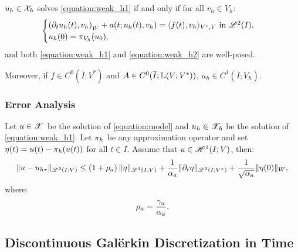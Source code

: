 \begin{proposition}[Equivalence]
    $u_h \in \mathcal{X}_h$ solves \cref{equation:weak_h1} if and only if for all $v_h \in V_h$:
    \begin{align}
        \begin{cases} \label{equation:weak_h2}
            \left( \partial_t u_h(t), v_h \right)_W + a(t; u_h(t), v_h) = \langle f(t), v_h \rangle_{V^*, V} \text{ in } \mathscr{L}^{2}(I), \\
            u_h(0) = \pi_{V_h}(u_0),
        \end{cases}
    \end{align}
    and both \cref{equation:weak_h1} and \cref{equation:weak_h2} are well-posed.

    Moreover, if $f \in C^0(\overline{I}; V^*)$ and $A \in C^0(\overline{I}; \mathbb{L}(V; V^*))$, $u_h \in C^1(\overline{I}; V_h)$.
\end{proposition}

\subsubsection{Error Analysis}




\begin{theorem} \label{theorem:estimate_h}
    Let $u \in \mathscr{X}$ be the solution of \cref{equation:model} and $u_h \in \mathscr{X}_h$ be the solution of \cref{equation:weak_h1}. Let $\pi_h$ be any approximation operator and set $\eta(t) = u(t) - \pi_h(u(t))$ for all $t \in I$. Assume that $u \in \mathscr{H}^{1}(I; V)$, then:
    \begin{align}
        \lVert u - u_{h \tau} \rVert_{\mathscr{L}^{2}(I; V)} \leq \left( 1 + \rho_{a} \right) \lVert \eta \rVert_{\mathscr{L}^{2}(I; V)} + \frac{1}{\alpha_{a}} \lVert \partial_t \eta \rVert_{\mathscr{L}^{2}(I; V^*)} + \frac{1}{\sqrt{\alpha_{a}}} \lVert \eta(0) \rVert_W,
    \end{align}
    where:
    \begin{align}
        \rho_{a} = \frac{\gamma_{a}}{\alpha_{a}}.
    \end{align}
\end{theorem}

\newpage
\subsection{Discontinuous Galërkin Discretization in Time} \label{subsection:time_dg}

